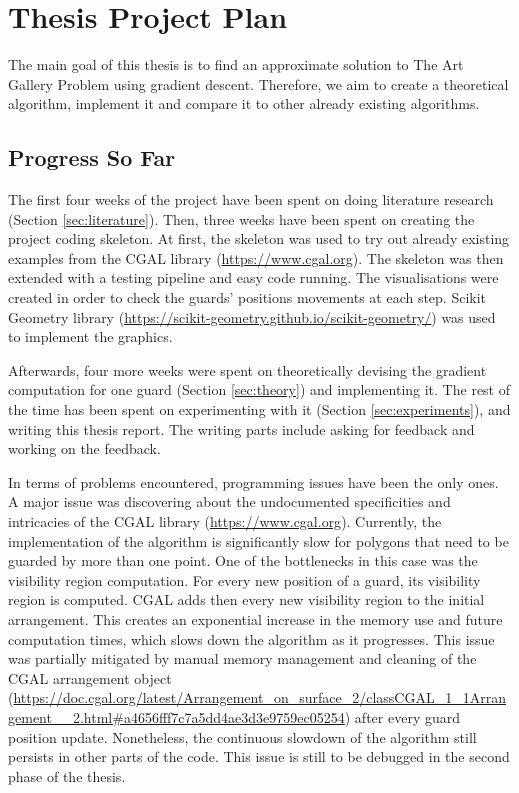 \section{Thesis Project Plan}
\label{sec:thesis}
The main goal of this thesis is to find an approximate solution to The Art Gallery Problem \cite{o1987art} using gradient descent. Therefore, we aim to create a theoretical algorithm, implement it and compare it to other already existing algorithms.

\subsection{Progress So Far}
The first four weeks of the project have been spent on doing literature research (Section \ref{sec:literature}). Then, three weeks have been spent on creating the project coding skeleton. At first, the skeleton was used to try out already existing examples from the CGAL library (\url{https://www.cgal.org}). The skeleton was then extended with a testing pipeline and easy code running. The visualisations were created in order to check the guards' positions movements at each step. Scikit Geometry library (\url{https://scikit-geometry.github.io/scikit-geometry/}) was used to implement the graphics.

Afterwards, four more weeks were spent on theoretically devising the gradient computation for one guard (Section \ref{sec:theory}) and implementing it. The rest of the time has been spent on experimenting with it (Section \ref{sec:experiments}), and writing this thesis report. The writing parts include asking for feedback and working on the feedback.

In terms of problems encountered, programming issues have been the only ones. A major issue was discovering about the undocumented specificities and intricacies of the CGAL library (\url{https://www.cgal.org}). 
Currently, the implementation of the algorithm is significantly slow for polygons that need to be guarded by more than one point. One of the bottlenecks in this case was the visibility region computation. For every new position of a guard, its visibility region is computed. CGAL adds then every new visibility region to the initial arrangement. This creates an exponential increase in the memory use and future computation times, which slows down the algorithm as it progresses. This issue was partially mitigated by manual memory management and cleaning of the CGAL arrangement object (\url{https://doc.cgal.org/latest/Arrangement_on_surface_2/classCGAL_1_1Arrangement__2.html#a4656fff7c7a5dd4ae3d3e9759ec05254}) after every guard position update.
Nonetheless, the continuous slowdown of the algorithm still persists in other parts of the code. This issue is still to be debugged in the second phase of the thesis. 

